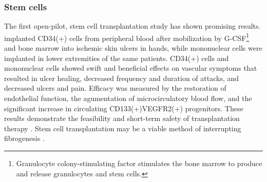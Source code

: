 \subsubsection{Stem cells}

The first open-pilot, stem cell transplantation study has shown promising
results. \citeauthor{nevskaya} implanted CD34(+) cells from peripheral blood
after mobilization by G-CSF\footnote{Granulocyte colony-stimulating factor
stimulates the bone marrow to produce and release granulocytes and stem
cells.} and bone marrow into ischemic skin ulcers in hands, while mononuclear
cells were implanted in lower extremities of the same patients. CD34(+) cells
and mononuclear cells showed swift and beneficial effects on vascular symptoms
that resulted in ulcer healing, decreased frequency and duration of \Rp
attacks, and decreased ulcers and pain. Efficacy was measured by the
restoration of endothelial function, the agumentation of microcirculatory
blood flow, and the significant increase in circulating CD133(+)VEGFR2(+)
progenitors. These results demonstrate the feasibility and short-term safety
of transplantation therapy \citep{nevskaya}. Stem cell transplantation may be
a viable method of interrupting fibrogenesis \citep{laar}.

